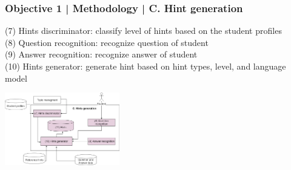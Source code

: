 \documentclass{beamer}
\begin{document}
\begin{frame}
\frametitle{Objective 1 | Methodology | C. Hint generation}
(7) Hints discriminator: classify level of hints based on the student profiles \\
(8) Question recognition: recognize question of student\\
(9) Answer recognition: recognize answer of student \\

(10) Hints generator: generate hint based on hint types, level, and language model \\
\begin{center}
	
	\includegraphics[width=50mm]{hf1.png}
\end{center}
\end{frame}
\end{document}
